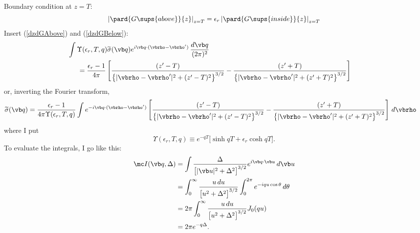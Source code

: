 \documentclass[letterpaper]{article}
\renewcommand{\wt}{\widetilde}
\begin{document}
Boundary condition at $z=T$:
$$            \left|\pard{G\sups{above}}{z}\right|_{z=T} = 
   \epsilon_r \left|\pard{G\sups{inside}}{z}\right|_{z=T} 
$$
Insert (\ref{dzdGAbove}) and (\ref{dzdGBelow}):
\begin{align*}
&\hspace{-0.2in}
\int \Upsilon(\epsilon_r,T,q) \wt\sigma(\vb q) e^{i\vb q \cdot (\vbrho-\vbrho^\prime)} 
\, \frac{d\vb q}{(2\pi)^2}
\\
&=\frac{\epsilon_r-1}{4\pi}
   \left[\frac{(z^\prime-T)}
           {\big\{ |\vbrho-\vbrho^\prime|^2 + (z^\prime-T)^2\big\}^{3/2}}
        -\frac{(z^\prime+T)}
           {\big\{ |\vbrho-\vbrho^\prime|^2 + (z^\prime+T)^2\big\}^{3/2}}
   \right]
\end{align*}
or, inverting the Fourier transform,
\begin{align*}
\wt \sigma(\vb q)
&=\frac{\epsilon_r-1}{4\pi\Upsilon(\epsilon_r, T, q)}
  \int e^{-i\vb q \cdot (\vbrho-\vbrho^\prime)}
   \left[\frac{(z^\prime-T)}
           {\big\{ |\vbrho-\vbrho^\prime|^2 + (z^\prime-T)^2\big\}^{3/2}}
        -\frac{(z^\prime+T)}
           {\big\{ |\vbrho-\vbrho^\prime|^2 + (z^\prime+T)^2\big\}^{3/2}}
   \right]
  \,d\vbrho
\end{align*}
where I put
$$ \Upsilon(\epsilon_r, T, q) \equiv
   e^{-qT}\Big[\sinh qT + \epsilon_r \cosh qT\Big].
$$
To evaluate the integrals, I go like this:
\begin{align*} 
 \mc I(\vb q, \Delta) 
&= 
 \int \frac{\Delta}{ \big[|\vb u|^2 + \Delta^2\big]^{3/2}}
  e^{i\vb q \cdot \vb u} \, d\vb u
\\
&= \int_0^\infty \frac{u\,du}{\big[u^2 + \Delta^2\big]^{3/2}}
   \int_0^{2\pi} e^{-i q u \cos\theta}\,d\theta 
\\
&= 2\pi \int_0^\infty \frac{u\,du}{\big[u^2 + \Delta^2\big]^{3/2}}J_0(qu)
\\
&= 2\pi e^{-q\Delta}.
\end{align*}
\end{document}
